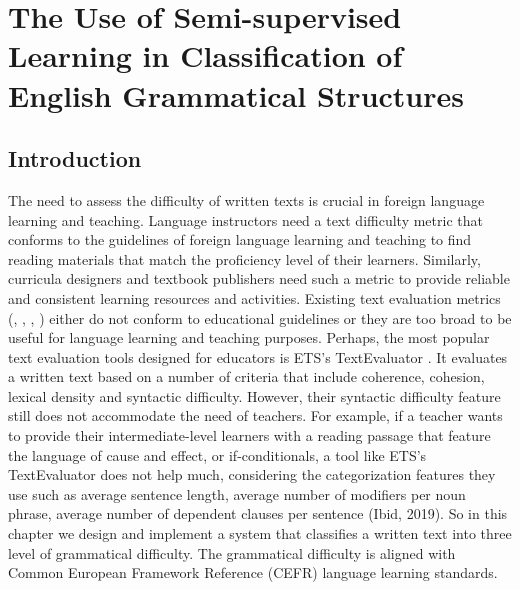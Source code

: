 
\chapter{The Use of Semi-supervised Learning in Classification of English Grammatical Structures} %

\label{Chapter2} %

\section{Introduction}

The need to assess the difficulty of written texts is crucial in foreign language learning and teaching. Language instructors need a text difficulty metric that conforms to the guidelines of foreign language learning and teaching to find reading materials that match the proficiency level of their learners. Similarly, curricula designers and textbook publishers need such a metric to provide reliable and consistent learning resources and activities. Existing text evaluation metrics (\cite{kincaid1975flesch}, \cite{stenner2006accurate}, \cite{landauer2011word}, \cite{graesser2011coh}) either do not conform to educational guidelines or they are too broad to be useful for language learning and teaching purposes. Perhaps, the most popular text evaluation tools designed for educators is ETS's TextEvaluator \citep{napolitano2015online}. It evaluates a written text based on a number of criteria that include coherence, cohesion, lexical density and syntactic difficulty. However, their syntactic difficulty feature still does not accommodate the need of teachers. For example, if a teacher wants to provide their intermediate-level learners with a reading passage that feature the language of cause and effect, or if-conditionals, a tool like ETS's TextEvaluator does not help much, considering the categorization features they use such as average sentence length, average number of modifiers per noun phrase, average number of dependent clauses per sentence (Ibid, 2019). So in this chapter we design and implement a system that classifies a written text into three level of grammatical difficulty. The grammatical difficulty is aligned with Common European Framework Reference (CEFR) \citep{council2001common} language learning standards. 

